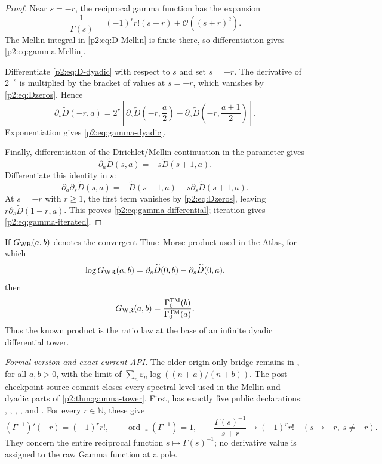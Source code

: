 \documentclass[11pt,oneside]{article}
\numberwithin{equation}{section}
\theoremstyle{definition}
\theoremstyle{remark}
\newcommand{\N}{\mathbb N}
\newcommand{\bigO}{\mathcal O}
\newcommand{\eps}{\varepsilon}
\begin{document}
\begin{proof}
Near $s=-r$, the reciprocal gamma function has the expansion
\[
 \frac1{\Gamma(s)}=(-1)^rr!(s+r)+\bigO((s+r)^2).
\]
The Mellin integral in \eqref{p2:eq:D-Mellin} is finite there, so differentiation gives
\eqref{p2:eq:gamma-Mellin}.

Differentiate \eqref{p2:eq:D-dyadic} with respect to $s$ and set $s=-r$.  The derivative of
$2^{-s}$ is multiplied by the bracket of values at $s=-r$, which vanishes by
\eqref{p2:eq:Dzeros}.  Hence
\[
 \partial_s\widetilde D(-r,a)
 =2^r\left[
 \partial_s\widetilde D\!\left(-r,\frac a2\right)
 -\partial_s\widetilde D\!\left(-r,\frac{a+1}{2}\right)
 \right].
\]
Exponentiation gives \eqref{p2:eq:gamma-dyadic}.

Finally, differentiation of the Dirichlet/Mellin continuation in the parameter gives
\[
 \partial_a\widetilde D(s,a)=-s\widetilde D(s+1,a).
\]
Differentiate this identity in $s$:
\[
 \partial_a\partial_s\widetilde D(s,a)
 =-\widetilde D(s+1,a)-s\partial_s\widetilde D(s+1,a).
\]
At $s=-r$ with $r\ge1$, the first term vanishes by \eqref{p2:eq:Dzeros}, leaving
$r\partial_s\widetilde D(1-r,a)$.  This proves \eqref{p2:eq:gamma-differential}; iteration gives
\eqref{p2:eq:gamma-iterated}.
\end{proof}

\begin{corollary}
\label{p2:cor:Woods-Robbins}
If $G_{\rm WR}(a,b)$ denotes the convergent Thue--Morse product used in the Atlas, for which
\[
 \log G_{\rm WR}(a,b)=\partial_s\widetilde D(0,b)
 -\partial_s\widetilde D(0,a),
\]
then
\begin{equation}
 G_{\rm WR}(a,b)=\frac{\Gamma_0^{\rm TM}(b)}{\Gamma_0^{\rm TM}(a)}.
 \label{p2:eq:WR-gamma}
\end{equation}
Thus the known product is the ratio law at the base of an infinite dyadic differential
tower.
\end{corollary}

\emph{Formal version and exact current API.}  The older origin-only bridge remains
 in , for
all \(a,b>0\), with  the limit of
\(\sum_n\eps_n\log((n+a)/(n+b))\).  The post-checkpoint source commit
 closes every spectral level used in the Mellin and dyadic parts
of \cref{p2:thm:gamma-tower}.  First,  has exactly
five public declarations:
,
,
,
, and
.  For every \(r\in\N\), these
give
\[
 (\Gamma^{-1})'(-r)=(-1)^r r!,\qquad
 \operatorname{ord}_{-r}(\Gamma^{-1})=1,\qquad
 \frac{\Gamma(s)^{-1}}{s+r}\longrightarrow(-1)^r r!
 \quad(s\to-r,\ s\ne-r).
\]
They concern the entire reciprocal function \(s\mapsto\Gamma(s)^{-1}\); no
derivative value is assigned to the raw Gamma function at a pole.
\end{document}
